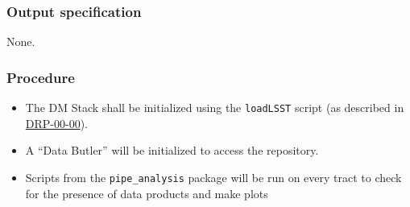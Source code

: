 \subsubsection{Output specification}

None.

\subsubsection{Procedure}

\begin{itemize}

  \item{The DM Stack shall be initialized using the \texttt{loadLSST} script
  (as described in \hyperref[drp-00-00]{DRP-00-00}).}

  \item{A ``Data Butler'' will be initialized to access the repository.}

  \item{Scripts from the \texttt{pipe\_analysis} package will be run on every tract to check for the presence of data products and make plots}

\end{itemize}
